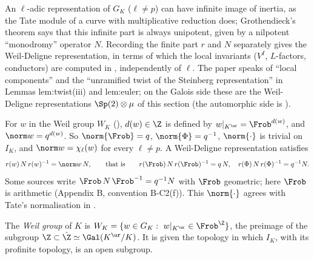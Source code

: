 An $\ell$-adic representation of $G_K$ ($\ell\ne p$) can have infinite image of inertia, as the Tate module of a curve with multiplicative reduction
does; Grothendieck's theorem says that this infinite part is always unipotent, given by a nilpotent ``monodromy'' operator $N$. Recording the
finite part $r$ and $N$ separately gives the Weil-Deligne representation, in terms of which the local invariants ($V^{I}$, $L$-factors, conductors)
are computed in , independently of $\ell$. The paper speaks of ``local components'' and the ``unramified twist of the
Steinberg representation'' in Lemmas lem:twist(iii) and lem:euler; on the Galois side these are the Weil-Deligne representations
$\Sp(2)\otimes\mu$ of this section (the automorphic side is ).

\begin{convention}\label{conv:local:weil}
For $w$ in the Weil group $W_K$ (), $d(w)\in\Z$ is defined by $w|_{K^{\ur}}=\Frob^{d(w)}$, and $\norm w=q^{d(w)}$. So $\norm{\Frob}=q$,
$\norm{\Phi}=q^{-1}$, $\norm{\cdot}$ is trivial on $I_K$, and $\norm w=\chi_\ell(w)$ for every $\ell\ne p$. A Weil-Deligne representation satisfies
\[
r(w)\,N\,r(w)^{-1}=\norm w\,N,\qquad\text{that is}\qquad r(\Frob)\,N\,r(\Frob)^{-1}=q\,N,\quad r(\Phi)\,N\,r(\Phi)^{-1}=q^{-1}N .
\]
Some sources write $\Frob\,N\,\Frob^{-1}=q^{-1}N$ with $\Frob$ geometric; here $\Frob$ is arithmetic (Appendix B, convention B-C2(f)). This $\norm{\cdot}$ agrees with
Tate's normalisation in \cite{Tate79}.
\end{convention}

\begin{definition}\label{def:local:weil-group}
The \emph{Weil group} of $K$ is $W_K=\{w\in G_K:\ w|_{K^{\ur}}\in\Frob^{\Z}\}$, the preimage of the subgroup $\Z\subset\hat\Z\simeq\Gal(K^{\ur}/K)$. It is given the
topology in which $I_K$, with its profinite topology, is an open subgroup.
\end{definition}

